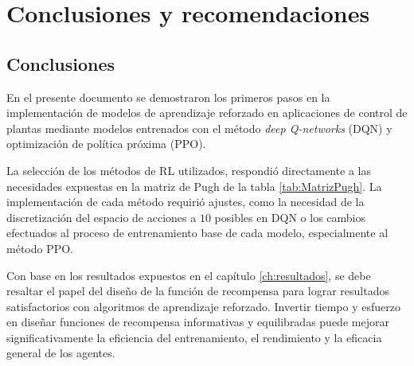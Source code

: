 \chapter{Conclusiones y recomendaciones}
\label{ch:conclusion}


\section{Conclusiones}

\begin{comment}
Las conclusiones no son un resumen de lo realizado sino a lo que ha llevado el
desarrollo de la tesis, no perdiendo de vista los objetivos planteados desde
el principio y los resultados obtenidos.  En otras palabras, qué se concluye o
a qué se ha llegado después de realizado la tesis de maestría.  Un error
común es ``concluir'' aspectos que no se desarrollaron en la tesis, como
observaciones o afirmaciones derivadas de la teoría directamente.  Esto último
debe evitarse.

Es fundamental en este capítulo hacer énfasis y puntualizar los
aportes específicos del trabajo.

Es usual concluir con lo que queda por hacer, o sugerencias para mejorar los
resultados.

\end{comment}



En el presente documento se demostraron los primeros pasos en la implementación de modelos de aprendizaje reforzado en aplicaciones de control de plantas mediante modelos entrenados con el método \textit{deep Q-networks} (DQN) y optimización de política próxima (PPO).

La selección de los métodos de RL utilizados, respondió directamente a las necesidades expuestas en la matriz de Pugh de la tabla \ref{tab:MatrizPugh}. La implementación de cada método requirió ajustes, como la necesidad de la discretización del espacio de acciones a $10$ posibles en DQN o los cambios efectuados al proceso de entrenamiento base de cada modelo, especialmente al método PPO.

Con base en los resultados expuestos en el capítulo \ref{ch:resultados}, se debe resaltar el papel del diseño de la función de recompensa para lograr resultados satisfactorios con algoritmos de aprendizaje reforzado. Invertir tiempo y esfuerzo en diseñar funciones de recompensa informativas y equilibradas puede mejorar significativamente la eficiencia del entrenamiento, el rendimiento y la eficacia general de los agentes.

